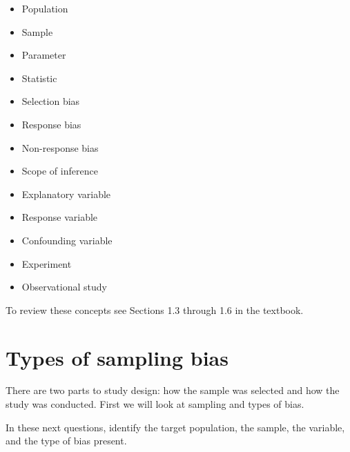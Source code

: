 \documentclass[
]{report}
\begin{document}
\begin{itemize}
\item
  Population
\item
  Sample
\item
  Parameter
\item
  Statistic
\item
  Selection bias
\item
  Response bias
\item
  Non-response bias
\item
  Scope of inference
\item
  Explanatory variable
\item
  Response variable
\item
  Confounding variable
\item
  Experiment
\item
  Observational study
\end{itemize}

To review these concepts see Sections 1.3 through 1.6 in the textbook.

\newpage

\hypertarget{types-of-sampling-bias}{%
\section{Types of sampling bias}\label{types-of-sampling-bias}}

There are two parts to study design: how the sample was selected and how the study was conducted. First we will look at sampling and types of bias.

In these next questions, identify the target population, the sample, the variable, and the type of bias present.
\end{document}
